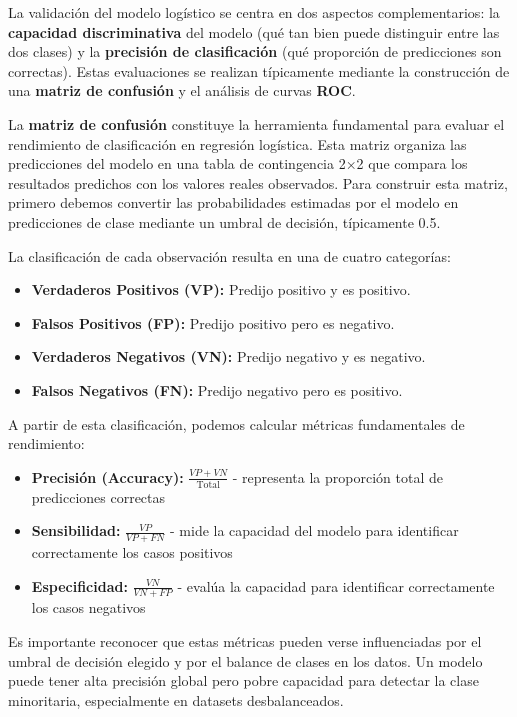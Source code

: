 \documentclass[
  letterpaper,
  DIV=11,
  numbers=noendperiod]{scrreprt}
\providecommand{\tightlist}{%
  \setlength{\itemsep}{0pt}\setlength{\parskip}{0pt}}
\begin{document}
La validación del modelo logístico se centra en dos aspectos
complementarios: la \textbf{capacidad discriminativa} del modelo (qué
tan bien puede distinguir entre las dos clases) y la \textbf{precisión
de clasificación} (qué proporción de predicciones son correctas). Estas
evaluaciones se realizan típicamente mediante la construcción de una
\textbf{matriz de confusión} y el análisis de curvas \textbf{ROC}.

La \textbf{matriz de confusión} constituye la herramienta fundamental
para evaluar el rendimiento de clasificación en regresión logística.
Esta matriz organiza las predicciones del modelo en una tabla de
contingencia 2×2 que compara los resultados predichos con los valores
reales observados. Para construir esta matriz, primero debemos convertir
las probabilidades estimadas por el modelo en predicciones de clase
mediante un umbral de decisión, típicamente 0.5.

La clasificación de cada observación resulta en una de cuatro
categorías:

\begin{itemize}
\tightlist
\item
  \textbf{Verdaderos Positivos (VP):} Predijo positivo y es positivo.
\item
  \textbf{Falsos Positivos (FP):} Predijo positivo pero es negativo.
\item
  \textbf{Verdaderos Negativos (VN):} Predijo negativo y es negativo.
\item
  \textbf{Falsos Negativos (FN):} Predijo negativo pero es positivo.
\end{itemize}

A partir de esta clasificación, podemos calcular métricas fundamentales
de rendimiento:

\begin{itemize}
\tightlist
\item
  \textbf{Precisión (Accuracy):} \(\frac{VP + VN}{\text{Total}}\) -
  representa la proporción total de predicciones correctas
\item
  \textbf{Sensibilidad:} \(\frac{VP}{VP + FN}\) - mide la capacidad del
  modelo para identificar correctamente los casos positivos\\
\item
  \textbf{Especificidad:} \(\frac{VN}{VN + FP}\) - evalúa la capacidad
  para identificar correctamente los casos negativos
\end{itemize}

Es importante reconocer que estas métricas pueden verse influenciadas
por el umbral de decisión elegido y por el balance de clases en los
datos. Un modelo puede tener alta precisión global pero pobre capacidad
para detectar la clase minoritaria, especialmente en datasets
desbalanceados.
\end{document}
